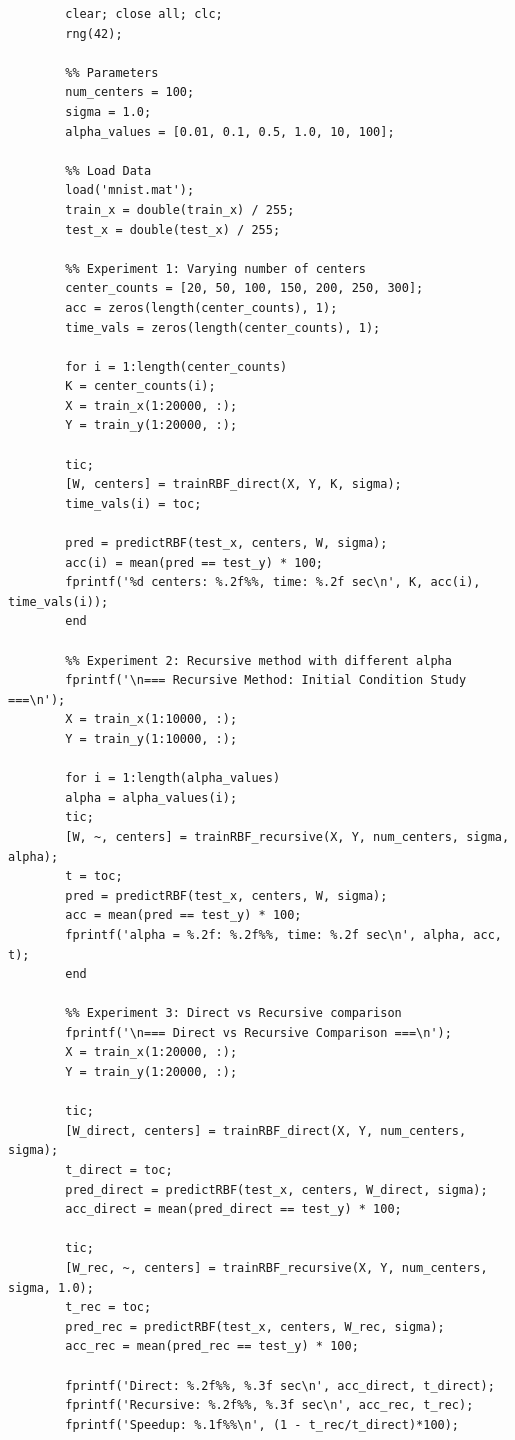 \documentclass[12pt]{article}
\begin{document}
	\begin{lstlisting}[caption=main.m]
		%% ECE8493 Project 3: RBF Neural Network for MNIST
		clear; close all; clc;
		rng(42);
		
		%% Parameters
		num_centers = 100;
		sigma = 1.0;
		alpha_values = [0.01, 0.1, 0.5, 1.0, 10, 100];
		
		%% Load Data
		load('mnist.mat');
		train_x = double(train_x) / 255;
		test_x = double(test_x) / 255;
		
		%% Experiment 1: Varying number of centers
		center_counts = [20, 50, 100, 150, 200, 250, 300];
		acc = zeros(length(center_counts), 1);
		time_vals = zeros(length(center_counts), 1);
		
		for i = 1:length(center_counts)
		K = center_counts(i);
		X = train_x(1:20000, :);
		Y = train_y(1:20000, :);
		
		tic;
		[W, centers] = trainRBF_direct(X, Y, K, sigma);
		time_vals(i) = toc;
		
		pred = predictRBF(test_x, centers, W, sigma);
		acc(i) = mean(pred == test_y) * 100;
		fprintf('%d centers: %.2f%%, time: %.2f sec\n', K, acc(i), time_vals(i));
		end
		
		%% Experiment 2: Recursive method with different alpha
		fprintf('\n=== Recursive Method: Initial Condition Study ===\n');
		X = train_x(1:10000, :);
		Y = train_y(1:10000, :);
		
		for i = 1:length(alpha_values)
		alpha = alpha_values(i);
		tic;
		[W, ~, centers] = trainRBF_recursive(X, Y, num_centers, sigma, alpha);
		t = toc;
		pred = predictRBF(test_x, centers, W, sigma);
		acc = mean(pred == test_y) * 100;
		fprintf('alpha = %.2f: %.2f%%, time: %.2f sec\n', alpha, acc, t);
		end
		
		%% Experiment 3: Direct vs Recursive comparison
		fprintf('\n=== Direct vs Recursive Comparison ===\n');
		X = train_x(1:20000, :);
		Y = train_y(1:20000, :);
		
		tic;
		[W_direct, centers] = trainRBF_direct(X, Y, num_centers, sigma);
		t_direct = toc;
		pred_direct = predictRBF(test_x, centers, W_direct, sigma);
		acc_direct = mean(pred_direct == test_y) * 100;
		
		tic;
		[W_rec, ~, centers] = trainRBF_recursive(X, Y, num_centers, sigma, 1.0);
		t_rec = toc;
		pred_rec = predictRBF(test_x, centers, W_rec, sigma);
		acc_rec = mean(pred_rec == test_y) * 100;
		
		fprintf('Direct: %.2f%%, %.3f sec\n', acc_direct, t_direct);
		fprintf('Recursive: %.2f%%, %.3f sec\n', acc_rec, t_rec);
		fprintf('Speedup: %.1f%%\n', (1 - t_rec/t_direct)*100);
	\end{lstlisting}
	
\end{document}
